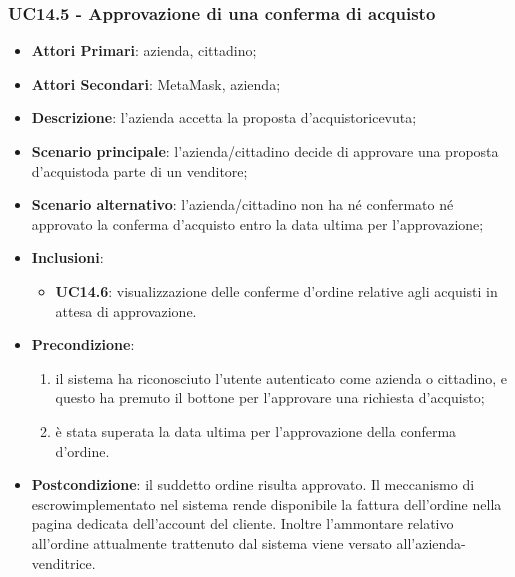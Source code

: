 \subsubsection{UC14.5 - Approvazione di una conferma di acquisto}
\begin{itemize}
	\item \textbf{Attori Primari}: azienda, cittadino;
	\item \textbf{Attori Secondari}: MetaMask\glo, azienda;
	\item \textbf{Descrizione}: l'azienda accetta la proposta d'acquisto\glosp ricevuta;
	\item \textbf{Scenario principale}: l'azienda/cittadino decide di approvare una proposta d'acquisto\glosp da parte di un venditore;
	\item \textbf{Scenario alternativo}: l'azienda/cittadino non ha né confermato né approvato la conferma d'acquisto entro la data ultima per l'approvazione;
		\item \textbf{Inclusioni}: 
	\begin{itemize}
		\item \textbf{UC14.6}:  visualizzazione delle conferme d'ordine\glosp 
		relative agli acquisti in attesa di approvazione.
	\end{itemize}
	\item \textbf{Precondizione}: 
	\begin{enumerate}[label=\alph*.]
		\item il sistema ha riconosciuto l'utente autenticato come azienda o cittadino, e questo ha premuto il bottone per l'approvare una richiesta d'acquisto;
		\item è stata superata la data ultima per l'approvazione della conferma d'ordine\glo.
	\end{enumerate}
	\item \textbf{Postcondizione}: il suddetto ordine risulta approvato. Il meccanismo di escrow\glosp implementato nel sistema rende disponibile la fattura dell'ordine nella pagina dedicata dell'account del cliente. Inoltre l'ammontare relativo all'ordine attualmente trattenuto dal sistema viene versato all'azienda-venditrice.
\end{itemize}


